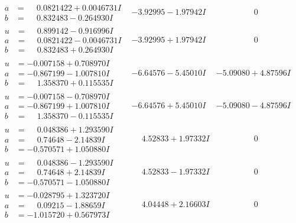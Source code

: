 \documentclass[1p]{elsarticle_modified}
\theoremstyle{definition}
\begin{document}
$$\begin{array}{c|c|c}
\begin{aligned}
a &= \phantom{-}0.0821422 + 0.0046731 I \\
b &= \phantom{-}0.832483 - 0.264930 I\end{aligned}
 & -3.92995 - 1.97942 I & \phantom{-0.000000 } 0 \\ \hline\begin{aligned}
u &= \phantom{-}0.899142 - 0.916996 I \\
a &= \phantom{-}0.0821422 - 0.0046731 I \\
b &= \phantom{-}0.832483 + 0.264930 I\end{aligned}
 & -3.92995 + 1.97942 I & \phantom{-0.000000 } 0 \\ \hline\begin{aligned}
u &= -0.007158 + 0.708970 I \\
a &= -0.867199 - 1.007810 I \\
b &= \phantom{-}1.358370 + 0.115535 I\end{aligned}
 & -6.64576 - 5.45010 I & -5.09080 + 4.87596 I \\ \hline\begin{aligned}
u &= -0.007158 - 0.708970 I \\
a &= -0.867199 + 1.007810 I \\
b &= \phantom{-}1.358370 - 0.115535 I\end{aligned}
 & -6.64576 + 5.45010 I & -5.09080 - 4.87596 I \\ \hline\begin{aligned}
u &= \phantom{-}0.048386 + 1.293590 I \\
a &= \phantom{-}0.74648 - 2.14839 I \\
b &= -0.570571 + 1.050880 I\end{aligned}
 & \phantom{-}4.52833 + 1.97332 I & \phantom{-0.000000 } 0 \\ \hline\begin{aligned}
u &= \phantom{-}0.048386 - 1.293590 I \\
a &= \phantom{-}0.74648 + 2.14839 I \\
b &= -0.570571 - 1.050880 I\end{aligned}
 & \phantom{-}4.52833 - 1.97332 I & \phantom{-0.000000 } 0 \\ \hline\begin{aligned}
u &= -0.028795 + 1.323720 I \\
a &= \phantom{-}0.09215 - 1.88659 I \\
b &= -1.015720 + 0.567973 I\end{aligned}
 & \phantom{-}4.04448 + 2.16603 I & \phantom{-0.000000 } 0 \\ \hline\begin{aligned}

\end{aligned}
\end{array}$$
\end{document}
